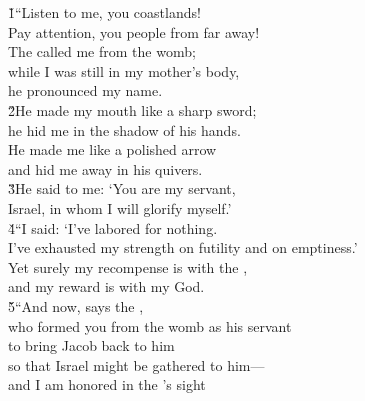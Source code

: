 \begin{poetry}
\poeml {}
\v{1}``Listen to me, you coastlands! \\
\poemll    Pay attention, you people from far away! \\
\poeml The  called me from the womb; \\
\poemll    while I was still in my mother's body, \\
\poemlll       he pronounced my name. \\
\poeml \v{2}He made my mouth like a sharp sword; \\
\poemll    he hid me in the shadow of his hands. \\
\poeml He made me like a polished arrow \\
\poemll    and hid me away in his quivers. \\
\poeml \v{3}He said to me: `You are my servant, \\
\poemll    Israel, in whom I will glorify myself.' \\
\poeml \v{4}``I said: `I've labored for nothing. \\
\poemll    I've exhausted my strength on futility and on emptiness.' \\
\poeml Yet surely my recompense is with the , \\
\poemll    and my reward is with my God. \\
\poeml \v{5}``And now, says the , \\
\poemll    who formed you from the womb as his servant \\
\poeml to bring Jacob back to him \\
\poemll    so that Israel might be gathered to him--- \\
\poeml and I am honored in the 's sight \\

\end{poetry}
